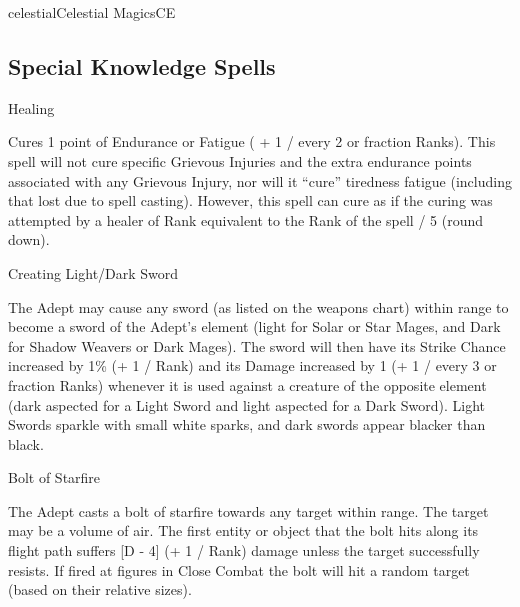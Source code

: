 \begin{college}[1.3]{celestial}{Celestial Magics}{CE}
\subsection{Special Knowledge Spells}

\begin{spell}[S-1]{Healing}

\begin{effects}
Cures 1 point of Endurance or Fatigue ( + 1 / every 2 or fraction
Ranks).  This spell will not cure specific Grievous Injuries and the
extra endurance points associated with any Grievous Injury, nor will
it ``cure'' tiredness fatigue (including that lost due to spell
casting). However, this spell can cure as if the curing was attempted
by a healer of Rank equivalent to the Rank of the spell / 5 (round
down).
\end{effects}
\end{spell}

\begin{spell}[S-2]{Creating Light/Dark Sword}
\begin{effects}
The Adept may cause any sword (as listed on the weapons chart) within
range to become a sword of the Adept's element (\ie light for Solar or
Star Mages, and Dark for Shadow Weavers or Dark Mages).  The sword
will then have its Strike Chance increased by 1\% (+ 1 / Rank) and its
Damage increased by 1 (+ 1 / every 3 or fraction Ranks) whenever it is
used against a creature of the opposite element (\ie dark aspected for
a Light Sword and light aspected for a Dark Sword).  Light Swords
sparkle with small white sparks, and dark swords appear blacker than
black.
\end{effects}
\end{spell}

\begin{spell}[S-3]{Bolt of Starfire}

\begin{effects}
The Adept casts a bolt of starfire towards any target within range.
The target may be a volume of air.  The first entity or object that
the bolt hits along its flight path suffers [D - 4] (+ 1 / Rank)
damage unless the target successfully resists.  If fired at figures in
Close Combat the bolt will hit a random target (based on their
relative sizes).
\end{effects}
\end{spell}


\end{college}
